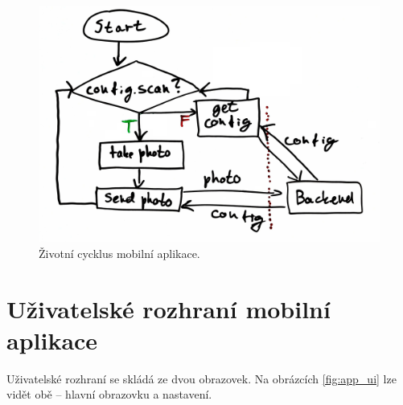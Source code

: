 \begin{figure}[!htb] \centering
  \includegraphics[width=135mm]{../img/app_lifecycle.jpg}
  \caption{Životní cycklus mobilní aplikace.}
  \label{fig:app_lifecycle}
\end{figure}

\section{Uživatelské rozhraní mobilní aplikace}

Uživatelské rozhraní se skládá ze dvou obrazovek. Na obrázcích \ref{fig:app_ui}
lze vidět obě -- hlavní obrazovku a nastavení.

